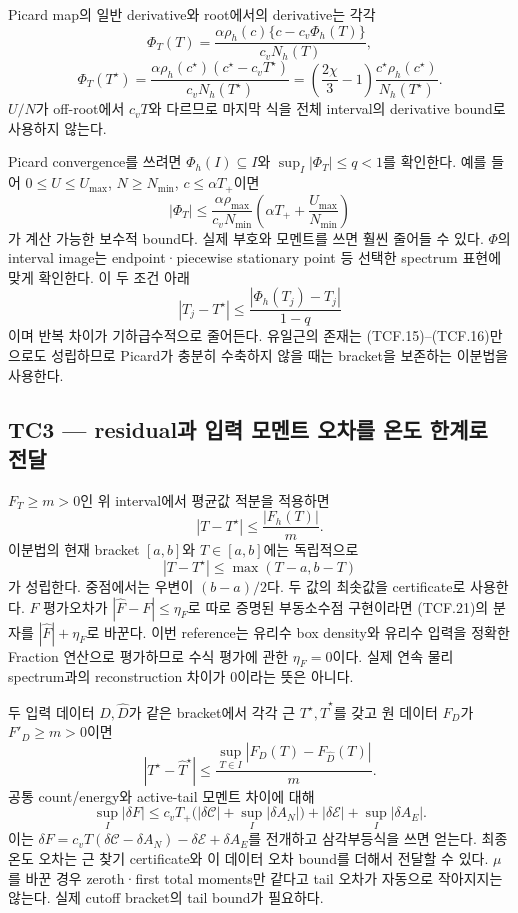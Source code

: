 \documentclass[11pt,a4paper]{article}
\begin{document}
Picard map의 일반 derivative와 root에서의 derivative는 각각 \[
\Phi_T(T)=
\frac{\alpha\rho_h(c)\{c-c_v\Phi_h(T)\}}{c_vN_h(T)},
\] \[
\Phi_T(T^\star)=
\frac{\alpha\rho_h(c^\star)(c^\star-c_vT^\star)}
{c_vN_h(T^\star)}
=\left(\frac{2\chi}{3}-1\right)
 \frac{c^\star\rho_h(c^\star)}{N_h(T^\star)} .
\tag{TCF.18}
\] \(U/N\)가 off-root에서 \(c_vT\)와 다르므로 마지막 식을 전체 interval의 derivative bound로 사용하지 않는다.

Picard convergence를 쓰려면 \(\Phi_h(I)\subseteq I\)와 \(\sup_I|\Phi_T|\le q<1\)를 확인한다. 예를 들어 \(0\le U\le U_{\max}\), \(N\ge N_{\min}\), \(c\le\alpha T_+\)이면 \[
|\Phi_T|\le
\frac{\alpha\rho_{\max}}{c_vN_{\min}}
\left(\alpha T_++\frac{U_{\max}}{N_{\min}}\right)
\tag{TCF.19}
\] 가 계산 가능한 보수적 bound다. 실제 부호와 모멘트를 쓰면 훨씬 줄어들 수 있다. \(\Phi\)의 interval image는 endpoint·piecewise stationary point 등 선택한 spectrum 표현에 맞게 확인한다. 이 두 조건 아래 \[
|T_j-T^\star|\le\frac{|\Phi_h(T_j)-T_j|}{1-q}
\tag{TCF.20}
\] 이며 반복 차이가 기하급수적으로 줄어든다. 유일근의 존재는 (TCF.15)--(TCF.16)만으로도 성립하므로 Picard가 충분히 수축하지 않을 때는 bracket을 보존하는 이분법을 사용한다.

\hypertarget{tc3-residualuxacfc-uxc785uxb825-uxbaa8uxba58uxd2b8-uxc624uxcc28uxb97c-uxc628uxb3c4-uxd55cuxacc4uxb85c-uxc804uxb2ec}{%
\subsection{TC3 --- residual과 입력 모멘트 오차를 온도 한계로 전달}\label{tc3-residualuxacfc-uxc785uxb825-uxbaa8uxba58uxd2b8-uxc624uxcc28uxb97c-uxc628uxb3c4-uxd55cuxacc4uxb85c-uxc804uxb2ec}}

\(F_T\ge m>0\)인 위 interval에서 평균값 적분을 적용하면 \[
\boxed{\quad |T-T^\star|\le \frac{|F_h(T)|}{m}.\quad}
\tag{TCF.21}
\] 이분법의 현재 bracket \([a,b]\)와 \(T\in[a,b]\)에는 독립적으로 \[
|T-T^\star|\le\max(T-a,b-T)
\tag{TCF.22}
\] 가 성립한다. 중점에서는 우변이 \((b-a)/2\)다. 두 값의 최솟값을 certificate로 사용한다. \(F\) 평가오차가 \(|\widehat F-F|\le\eta_F\)로 따로 증명된 부동소수점 구현이라면 (TCF.21)의 분자를 \(|\widehat F|+\eta_F\)로 바꾼다. 이번 reference는 유리수 box density와 유리수 입력을 정확한 Fraction 연산으로 평가하므로 수식 평가에 관한 \(\eta_F=0\)이다. 실제 연속 물리 spectrum과의 reconstruction 차이가 0이라는 뜻은 아니다.

두 입력 데이터 \(D,\widehat D\)가 같은 bracket에서 각각 근 \(T^\star,\widehat T^\star\)를 갖고 원 데이터 \(F_D\)가 \(F'_D\ge m>0\)이면 \[
|T^\star-\widehat T^\star|
\le\frac{\sup_{T\in I}|F_D(T)-F_{\widehat D}(T)|}{m}.
\tag{TCF.23}
\] 공통 count/energy와 active-tail 모멘트 차이에 대해 \[
\sup_I|\delta F|
\le c_vT_+\bigl(|\delta\mathscr C|+\sup_I|\delta A_N|\bigr)
+|\delta\mathscr E|+\sup_I|\delta A_E|.
\tag{TCF.24}
\] 이는 \(\delta F=c_vT(\delta\mathscr C-\delta A_N)-\delta\mathscr E+\delta A_E\)를 전개하고 삼각부등식을 쓰면 얻는다. 최종 온도 오차는 근 찾기 certificate와 이 데이터 오차 bound를 더해서 전달할 수 있다. \(\mu\)를 바꾼 경우 zeroth·first total moments만 같다고 tail 오차가 자동으로 작아지지는 않는다. 실제 cutoff bracket의 tail bound가 필요하다.
\end{document}
